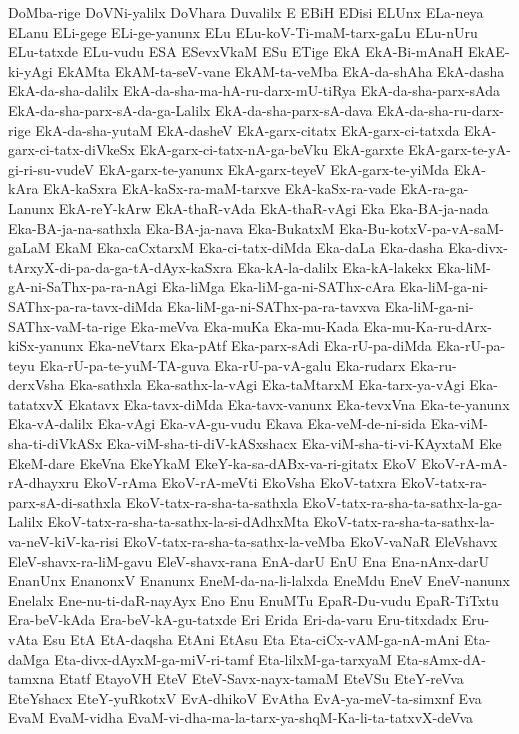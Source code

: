 {DoMba-rige
DoVNi-yalilx
DoVhara
Duvalilx
E
EBiH
EDisi
ELUnx
ELa-neya
ELanu
ELi-gege
ELi-ge-yanunx
ELu
ELu-koV-Ti-maM-tarx-gaLu
ELu-nUru
ELu-tatxde
ELu-vudu
ESA
ESevxVkaM
ESu
ETige
EkA
EkA-Bi-mAnaH
EkAE-ki-yAgi
EkAMta
EkAM-ta-seV-vane
EkAM-ta-veMba
EkA-da-shAha
EkA-dasha
EkA-da-sha-dalilx
EkA-da-sha-ma-hA-ru-darx-mU-tiRya
EkA-da-sha-parx-sAda
EkA-da-sha-parx-sA-da-ga-Lalilx
EkA-da-sha-parx-sA-dava
EkA-da-sha-ru-darx-rige
EkA-da-sha-yutaM
EkA-dasheV
EkA-garx-citatx
EkA-garx-ci-tatxda
EkA-garx-ci-tatx-diVkeSx
EkA-garx-ci-tatx-nA-ga-beVku
EkA-garxte
EkA-garx-te-yA-gi-ri-su-vudeV
EkA-garx-te-yanunx
EkA-garx-teyeV
EkA-garx-te-yiMda
EkA-kAra
EkA-kaSxra
EkA-kaSx-ra-maM-tarxve
EkA-kaSx-ra-vade
EkA-ra-ga-Lanunx
EkA-reY-kArw
EkA-thaR-vAda
EkA-thaR-vAgi
Eka
Eka-BA-ja-nada
Eka-BA-ja-na-sathxla
Eka-BA-ja-nava
Eka-BukatxM
Eka-Bu-kotxV-pa-vA-saM-gaLaM
EkaM
Eka-caCxtarxM
Eka-ci-tatx-diMda
Eka-daLa
Eka-dasha
Eka-divx-tArxyX-di-pa-da-ga-tA-dAyx-kaSxra
Eka-kA-la-dalilx
Eka-kA-lakekx
Eka-liM-gA-ni-SaThx-pa-ra-nAgi
Eka-liMga
Eka-liM-ga-ni-SAThx-cAra
Eka-liM-ga-ni-SAThx-pa-ra-tavx-diMda
Eka-liM-ga-ni-SAThx-pa-ra-tavxva
Eka-liM-ga-ni-SAThx-vaM-ta-rige
Eka-meVva
Eka-muKa
Eka-mu-Kada
Eka-mu-Ka-ru-dArx-kiSx-yanunx
Eka-neVtarx
Eka-pAtf
Eka-parx-sAdi
Eka-rU-pa-diMda
Eka-rU-pa-teyu
Eka-rU-pa-te-yuM-TA-guva
Eka-rU-pa-vA-galu
Eka-rudarx
Eka-ru-derxVsha
Eka-sathxla
Eka-sathx-la-vAgi
Eka-taMtarxM
Eka-tarx-ya-vAgi
Eka-tatatxvX
Ekatavx
Eka-tavx-diMda
Eka-tavx-vanunx
Eka-tevxVna
Eka-te-yanunx
Eka-vA-dalilx
Eka-vAgi
Eka-vA-gu-vudu
Ekava
Eka-veM-de-ni-sida
Eka-viM-sha-ti-diVkASx
Eka-viM-sha-ti-diV-kASxshacx
Eka-viM-sha-ti-vi-KAyxtaM
Eke
EkeM-dare
EkeVna
EkeYkaM
EkeY-ka-sa-dABx-va-ri-gitatx
EkoV
EkoV-rA-mA-rA-dhayxru
EkoV-rAma
EkoV-rA-meVti
EkoVsha
EkoV-tatxra
EkoV-tatx-ra-parx-sA-di-sathxla
EkoV-tatx-ra-sha-ta-sathxla
EkoV-tatx-ra-sha-ta-sathx-la-ga-Lalilx
EkoV-tatx-ra-sha-ta-sathx-la-si-dAdhxMta
EkoV-tatx-ra-sha-ta-sathx-la-va-neV-kiV-ka-risi
EkoV-tatx-ra-sha-ta-sathx-la-veMba
EkoV-vaNaR
EleVshavx
EleV-shavx-ra-liM-gavu
EleV-shavx-rana
EnA-darU
EnU
Ena
Ena-nAnx-darU
EnanUnx
EnanonxV
Enanunx
EneM-da-na-li-lalxda
EneMdu
EneV
EneV-nanunx
Enelalx
Ene-nu-ti-daR-nayAyx
Eno
Enu
EnuMTu
EpaR-Du-vudu
EpaR-TiTxtu
Era-beV-kAda
Era-beV-kA-gu-tatxde
Eri
Erida
Eri-da-varu
Eru-titxdadx
Eru-vAta
Esu
EtA
EtA-daqsha
EtAni
EtAsu
Eta
Eta-ciCx-vAM-ga-nA-mAni
Eta-daMga
Eta-divx-dAyxM-ga-miV-ri-tamf
Eta-lilxM-ga-tarxyaM
Eta-sAmx-dA-tamxna
Etatf
EtayoVH
EteV
EteV-Savx-nayx-tamaM
EteVSu
EteY-reVva
EteYshacx
EteY-yuRkotxV
EvA-dhikoV
EvAtha
EvA-ya-meV-ta-simxnf
Eva
EvaM
EvaM-vidha
EvaM-vi-dha-ma-la-tarx-ya-shqM-Ka-li-ta-tatxvX-deVva
}
